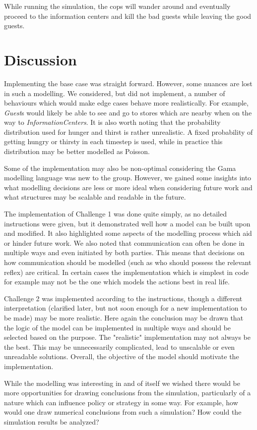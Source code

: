 \documentclass[a4paper]{article}
\begin{document}
While running the simulation, the cops will wander around and eventually proceed to the information centers and kill the bad guests while leaving the good guests.

\section{Discussion}
Implementing the base case was straight forward. However, some nuances are lost in such a modelling. We considered, but did not implement, a number of behaviours which would make edge cases behave more realistically. For example, \textit{Guest}s would likely be able to see and go to stores which are nearby when on the way to \textit{InformationCenters}. It is also worth noting that the probability distribution used for hunger and thirst is rather unrealistic. A fixed probability of getting hungry or thirsty in each timestep is used, while in practice this distribution may be better modelled as Poisson.

Some of the implementation may also be non-optimal considering the Gama modelling language was new to the group. However, we gained some insights into what modelling decisions are less or more ideal when considering future work and what structures may be scalable and readable in the future. 

The implementation of Challenge 1 was done quite simply, as no detailed instructions were given, but it demonstrated well how a model can be built upon and modified. It also highlighted some aspects of the modelling process which aid or hinder future work. We also noted that communication can often be done in multiple ways and even initiated by both parties. This means that decisions on how communication should be modelled (such as who should possess the relevant reflex) are critical. In certain cases the implementation which is simplest in code for example may not be the one which models the actions best in real life.

Challenge 2 was implemented according to the instructions, though a different interpretation (clarified later, but not soon enough for a new implementation to be made) may be more realistic. Here again the conclusion may be drawn that the logic of the model can be implemented in multiple ways and should be selected based on the purpose. The "realistic" implementation may not always be the best. This may be unnecessarily complicated, lead to unscalable or even unreadable solutions. Overall, the objective of the model should motivate the implementation.

While the modelling was interesting in and of itself we wished there would be more opportunities for drawing conclusions from the simulation, particularly of a nature which can influence policy or strategy in some way. For example, how would one draw numerical conclusions from such a simulation? How could the simulation results be analyzed?
\end{document}
